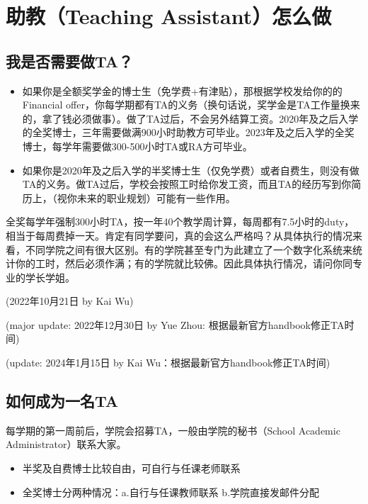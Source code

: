 \section{助教（Teaching Assistant）怎么做}

\subsection{我是否需要做TA？}
\begin{itemize}
    \item 如果你是全额奖学金的博士生（免学费+有津贴），那根据学校发给你的的Financial offer，你每学期都有TA的义务（换句话说，奖学金是TA工作量换来的，拿了钱必须做事）。做了TA过后，不会另外结算工资。2020年及之后入学的全奖博士，三年需要做满900小时助教方可毕业。2023年及之后入学的全奖博士，每学年需要做300-500小时TA或RA方可毕业。
    \item 如果你是2020年及之后入学的半奖博士生（仅免学费）或者自费生，则没有做TA的义务。做TA过后，学校会按照工时给你发工资，而且TA的经历写到你简历上，（视你未来的职业规划）可能有一些作用。
\end{itemize}

全奖每学年强制300小时TA，按一年40个教学周计算，每周都有7.5小时的duty，相当于每周费掉一天。肯定有同学要问，真的会这么严格吗？从具体执行的情况来看，不同学院之间有很大区别。有的学院甚至专门为此建立了一个数字化系统来统计你的工时，然后必须作满；有的学院就比较佛。因此具体执行情况，请问你同专业的学长学姐。

\begin{flushright}
    (2022年10月21日 by Kai Wu)

    (major update: 2022年12月30日 by Yue Zhou: 根据最新官方handbook修正TA时间)

    (update: 2024年1月15日 by Kai Wu：根据最新官方handbook修正TA时间)
\end{flushright}

\subsection{如何成为一名TA}

每学期的第一周前后，学院会招募TA，一般由学院的秘书（School Academic Administrator）联系大家。
\begin{itemize}
    \item 半奖及自费博士比较自由，可自行与任课老师联系
    \item 全奖博士分两种情况：a.自行与任课教师联系 b.学院直接发邮件分配
\end{itemize}

